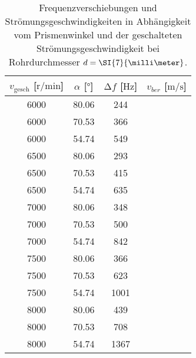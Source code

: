 \begin{table}
    \centering
    \caption{Frequenzverschiebungen und Strömungsgeschwindigkeiten in Abhängigkeit vom Prismenwinkel und der geschalteten Strömungsgeschwindigkeit bei Rohrdurchmesser $\protect d = \SI{7}{\milli\meter}$.}
    \label{tab:4}
    \begin{tabular}{c c c c}
        \toprule
        $v_{\text{gesch}}$ [$\si{{\text{r}}\per\minute}$]  & $\alpha$ [$\si{\degree}$]  & $\increment f$ [$\si{\hertz}$]  &$v_{ber}$ [$\si{\meter\per\second}$] \\
        \midrule
        6000    &   80.06    & 244   & ~ \\ 
        6000    &   70.53    & 366   & ~ \\ 
        6000    &   54.74    & 549   & ~ \\ 
        \midrule
        6500    &   80.06   & 293    & ~ \\ 
        6500    &   70.53   & 415    & ~ \\ 
        6500    &   54.74   & 635    & ~ \\ 
        \midrule
        7000    &   80.06   & 348    & ~ \\ 
        7000    &   70.53   & 500    & ~ \\ 
        7000    &   54.74   & 842    & ~ \\ 
        \midrule
        7500    &   80.06   & 366    & ~ \\ 
        7500    &   70.53   & 623    & ~ \\ 
        7500    &   54.74   & 1001   & ~ \\ 
        \midrule
        8000    &   80.06   & 439    & ~ \\ 
        8000    &   70.53   & 708    & ~ \\ 
        8000    &   54.74   & 1367   & ~ \\ 
        \bottomrule
    \end{tabular}
\end{table}
        
